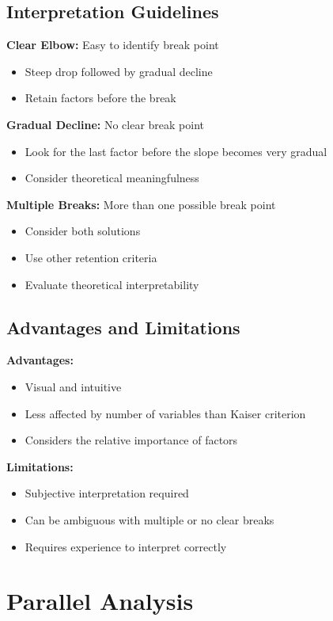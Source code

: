 \documentclass[a4paper]{tufte-book}
\begin{document}
\subsection{Interpretation Guidelines}

\textbf{Clear Elbow:} Easy to identify break point
\begin{itemize}
\item Steep drop followed by gradual decline
\item Retain factors before the break
\end{itemize}

\textbf{Gradual Decline:} No clear break point
\begin{itemize}
\item Look for the last factor before the slope becomes very gradual
\item Consider theoretical meaningfulness
\end{itemize}

\textbf{Multiple Breaks:} More than one possible break point
\begin{itemize}
\item Consider both solutions
\item Use other retention criteria
\item Evaluate theoretical interpretability
\end{itemize}

\subsection{Advantages and Limitations}

\textbf{Advantages:}
\begin{itemize}
\item Visual and intuitive
\item Less affected by number of variables than Kaiser criterion
\item Considers the relative importance of factors
\end{itemize}

\textbf{Limitations:}
\begin{itemize}
\item Subjective interpretation required
\item Can be ambiguous with multiple or no clear breaks
\item Requires experience to interpret correctly
\end{itemize}

\section{Parallel Analysis}
\end{document}
